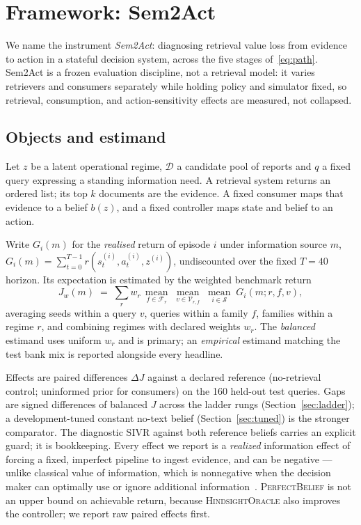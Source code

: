 \documentclass[a4paper,runningheads]{llncs}
\begin{document}
\section{Framework: Sem2Act}
\label{sec:framework}

We name the instrument \emph{Sem2Act}: diagnosing retrieval value loss
from evidence to action in a stateful decision system, across the five
stages of~\eqref{eq:path}. Sem2Act is a frozen evaluation discipline,
not a retrieval model: it varies retrievers and consumers separately
while holding policy and simulator fixed, so retrieval, consumption,
and action-sensitivity effects are measured, not collapsed.



\subsection{Objects and estimand}

Let $z$ be a latent operational regime, $\mathcal{D}$ a candidate pool of
reports and $q$ a fixed query expressing a standing information need. A
retrieval system returns an ordered list; its top $k$ documents are the
evidence. A fixed consumer maps that evidence to a belief $b(z)$, and a fixed
controller maps state and belief to an action.

Write $G_i(m)$ for the \emph{realised} return of episode $i$ under information
source $m$, $G_i(m)=\sum_{t=0}^{T-1} r(s^{(i)}_t,a^{(i)}_t,z^{(i)})$,
undiscounted over the fixed $T=40$ horizon. Its expectation is estimated by
the weighted benchmark return
\begin{equation}
\label{eq:jw}
J_w(m) \;=\; \sum_{r} w_r \,
\operatorname*{mean}_{f \in \mathcal{F}_r} \;
\operatorname*{mean}_{v \in \mathcal{V}_{r,f}} \;
\operatorname*{mean}_{i \in \mathcal{S}} \; G_i(m; r, f, v),
\end{equation}
averaging seeds within a query $v$, queries within a family $f$, families
within a regime $r$, and combining regimes with declared weights $w_r$. The
\emph{balanced} estimand uses uniform $w_r$ and is primary; an
\emph{empirical} estimand matching the test bank mix is reported alongside
every headline.

Effects are paired differences $\Delta J$ against a declared
reference (no-retrieval control; uninformed prior for consumers) on the
160 held-out test queries. Gaps
are signed differences of balanced $J$ across the ladder rungs
(Section~\ref{sec:ladder}); a development-tuned constant no-text belief
(Section~\ref{sec:tuned}) is the stronger comparator. The
diagnostic $\mathrm{SIVR}$ against both
reference beliefs carries an explicit guard; it is bookkeeping. Every
effect we report is a \emph{realized} information effect of forcing a
fixed, imperfect pipeline to ingest evidence, and can be negative ---
unlike classical value of information, which is nonnegative when the
decision maker can optimally use or ignore additional
information~\cite{howard1966information}. \textsc{PerfectBelief} is
not an upper bound on achievable return, because
\textsc{HindsightOracle} also improves the controller; we report raw
paired effects first.
\end{document}
